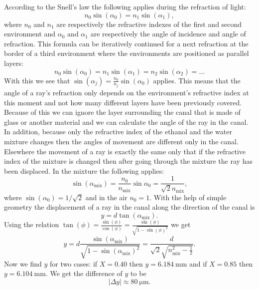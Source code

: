 \documentclass[11pt]{article}
\begin{document}
\solueng
According to the Snell’s law the following applies during the refraction of light:
$$n_0\sin(\alpha_0)=n_1\sin(\alpha_1),$$ 
where $n_0$ and $n_1$ are respectively the refractive indexes of the first and second environment and $\alpha_0$ and $\alpha_1$ are respectively the angle of incidence and angle of refraction. This formula can be iteratively continued for a next refraction at the border of a third environment where the environments are positioned as parallel layers:
$$n_0\sin(\alpha_0)=n_1\sin(\alpha_1)=n_2\sin(\alpha_2) = \dots$$ 
With this we see that $\sin(\alpha_j)=\frac{n_0}{n_j}\sin(\alpha_0)$ applies. This means that the angle of a ray’s refraction only depends on the environment’s refractive index at this moment and not how many different layers have been previously covered. Because of this we can ignore the layer surrounding the canal that is made of glass or another material and we can calculate the angle of the ray in the canal. In addition, because only the refractive index of the ethanol and the water mixture changes then the angles of movement are different only in the canal. Elsewhere the movement of a ray is exactly the same only that if the refractive index of the mixture is changed then after going through the mixture the ray has been displaced. In the mixture the following applies:
$$\sin(\alpha_{\text{mix}})=\frac{n_0}{n_{\text{mix}}}\sin{\alpha_0} = \frac{1}{\sqrt{2}n_{\text{mix}}},$$ 
where $\sin(\alpha_0) = 1/\sqrt{2}$ and in the air $n_0=1$. With the help of simple geometry the displacement of a ray in the canal along the direction of the canal is 
$$y=d\tan(\alpha_{\text{mix}}).$$ 
Using the relation $\tan(\phi) = \frac{\sin(\phi)}{\cos(\phi)} = \frac{\sin(\phi)}{\sqrt{1-\sin(\phi)^2}}$ we get 
$$y = d \frac{\sin(\alpha_{\text{mix}})}{\sqrt{1-\sin(\alpha_{\text{mix}})^2}} = \frac{d}{\sqrt{2}\sqrt{n_{\text{mix}}^2-\frac12}}.$$ 
Now we find $y$ for two cases: if $X=\num{0.40}$ then $y=\SI{6.184}{\milli\meter}$ and if $X=\num{0.85}$ then $y=\SI{6.104}{\milli\meter}$. We get the difference of $y$ to be
$$|\Delta y| \approx \SI{80}{\micro\meter}.$$
\probend
\bigskip

\end{document}
